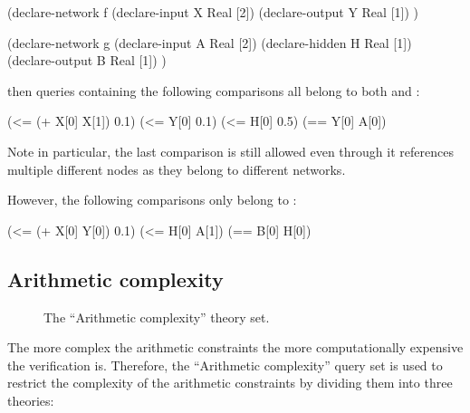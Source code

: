 \begin{code}[style=lbnf]
(declare-network f
    (declare-input  X Real [2])
    (declare-output Y Real [1])
)

(declare-network g
    (declare-input  A Real [2])
    (declare-hidden H Real [1])
    (declare-output B Real [1])
)
\end{code}

\noindent then queries containing the following comparisons all belong to both \snc{} and \mnc{}:

\begin{code}[style=lbnf]
(<= (+ X[0] X[1]) 0.1)
(<= Y[0] 0.1)
(<= H[0] 0.5)
(== Y[0] A[0])
\end{code}

\noindent Note in particular, the last comparison is still allowed even through it references multiple different nodes as they belong to different networks. 

However, the following comparisons only belong to \mnc{}:

\begin{code}[style=lbnf]
(<= (+ X[0] Y[0]) 0.1)
(<= H[0] A[1])
(== B[0] H[0])
\end{code}

\subsection{Arithmetic complexity}

\begin{figure}[h]
\centering
{}
\caption{The ``Arithmetic complexity'' theory set.}
\label{fig:arithmetic-complexities}
\end{figure}

The more complex the arithmetic constraints the more computationally expensive the verification is. Therefore, the ``Arithmetic complexity'' query set is used to restrict the complexity of the arithmetic constraints by dividing them into three theories:

